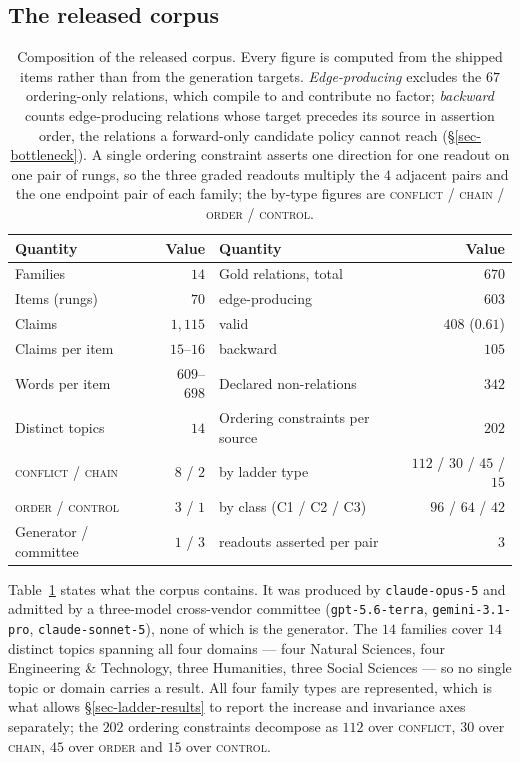 \subsection{The released corpus}
\label{sec-bench-corpus}

\begin{table}[tbp]
\centering\small
\caption{Composition of the released corpus. Every figure is computed from the shipped items rather than
  from the generation targets. \emph{Edge-producing} excludes the $67$ ordering-only relations, which
  compile to  and contribute no factor; \emph{backward} counts edge-producing relations
  whose target precedes its source in assertion order, the relations a forward-only candidate policy
  cannot reach (\S\ref{sec-bottleneck}). A single ordering constraint asserts one direction for one
  readout on one pair of rungs, so the three graded readouts multiply the $4$ adjacent pairs and
  the one endpoint pair of each family; the by-type figures are \textsc{conflict} / \textsc{chain} /
  \textsc{order} / \textsc{control}.}
\label{tab:corpus}
\begin{tabular}{@{}lr@{\qquad}lr@{}}
\toprule
Quantity & Value & Quantity & Value \\
\midrule
Families              & $14$   & Gold relations, total            & $670$ \\
Items (rungs)         & $70$   & \quad edge-producing             & $603$ \\
Claims                & $1{,}115$ & \quad valid                   & $408$ \quad ($0.61$) \\
Claims per item       & $15$--$16$ & \quad backward                & $105$ \\
Words per item        & $609$--$698$ & Declared non-relations      & $342$ \\
Distinct topics       & $14$   & Ordering constraints per source     & $202$ \\
\midrule
\textsc{conflict} / \textsc{chain} & $8$ / $2$ & \quad by ladder type & $112$ / $30$ / $45$ / $15$ \\
\textsc{order} / \textsc{control}  & $3$ / $1$ & \quad by class (C1 / C2 / C3) & $96$ / $64$ / $42$ \\
Generator / committee & $1$ / $3$ & \quad readouts asserted per pair & $3$ \\
\bottomrule
\end{tabular}
\end{table}

Table~\ref{tab:corpus} states what the corpus contains. It was produced by \texttt{claude-opus-5} and
admitted by a three-model cross-vendor committee (\texttt{gpt-5.6-terra}, \texttt{gemini-3.1-pro},
\texttt{claude-sonnet-5}), none of which is the generator. The $14$ families cover $14$ distinct topics
spanning all four domains --- four Natural Sciences, four Engineering \& Technology, three Humanities,
three Social Sciences --- so no single topic or domain carries a result. All four family types are
represented, which is what allows \S\ref{sec-ladder-results} to report the increase and invariance axes
separately; the $202$ ordering constraints decompose as $112$ over \textsc{conflict}, $30$ over
\textsc{chain}, $45$ over \textsc{order} and $15$ over \textsc{control}.

